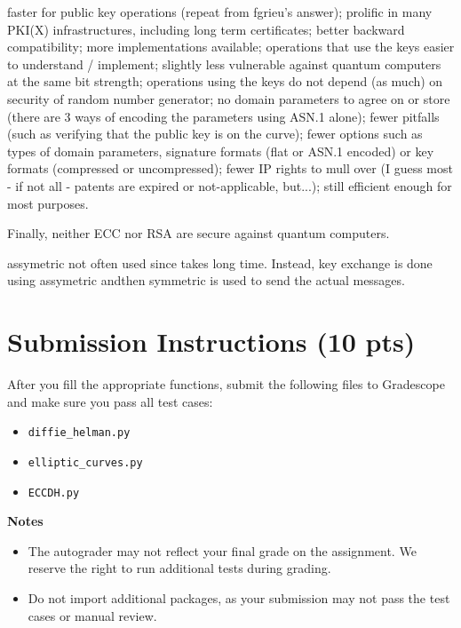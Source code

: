 \documentclass{article}
\begin{document}
faster for public key operations (repeat from fgrieu's answer);
prolific in many PKI(X) infrastructures, including long term certificates;
better backward compatibility;
more implementations available;
operations that use the keys easier to understand / implement;
slightly less vulnerable against quantum computers at the same bit strength;
operations using the keys do not depend (as much) on security of random number generator;
no domain parameters to agree on or store (there are 3 ways of encoding the parameters using ASN.1 alone);
fewer pitfalls (such as verifying that the public key is on the curve);
fewer options such as types of domain parameters, signature formats (flat or ASN.1 encoded) or key formats (compressed or uncompressed);
fewer IP rights to mull over (I guess most - if not all - patents are expired or not-applicable, but...);
still efficient enough for most purposes.


Finally, neither ECC nor RSA are secure against quantum computers.

assymetric not often used since takes long time. Instead, key exchange is done using assymetric andthen symmetric is used to send the actual messages.


\section*{Submission Instructions (10 pts)}
    After you fill the appropriate functions, submit the following files to Gradescope and make sure you pass all test cases:
    \begin{itemize}
        \item \lstinline{diffie_helman.py}
        \item \lstinline{elliptic_curves.py}
        \item \lstinline{ECCDH.py}
    \end{itemize}

    \vspace{3mm}
    \textbf{Notes}
    \begin{itemize}
        \item The autograder may not reflect your final grade on the assignment. We reserve the right to run additional tests during grading.
        \item Do not import additional packages, as your submission may not pass the test cases or manual review.
    \end{itemize}
\end{document}
